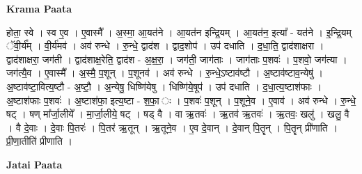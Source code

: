 \documentclass[17pt]{extarticle}
\begin{document}
\textbf{Krama Paata} \newline

होता॒ स्वे । स्व ए॒व । ए॒वास्मै᳚ । अ॒स्मा॒ आ॒यत॑ने । आ॒यत॑न इन्द्रि॒यम् । आ॒यत॑न॒ इत्या᳚ - यत॑ने । इ॒न्द्रि॒यम् ॅवी॒र्य᳚म् । वी॒र्य॑मव॑ । अव॑ रुन्धे । रु॒न्धे॒ द्वाद॑श । द्वाद॒शोप॑ । उप॑ दधाति । द॒धा॒ति॒ द्वाद॑शाक्षरा । द्वाद॑शाक्षरा॒ जग॑ती । द्वाद॑शाक्ष॒रेति॒ द्वाद॑श - अ॒क्ष॒रा॒ । जग॑ती॒ जाग॑ताः । जाग॑ताः प॒शवः॑ । प॒शवो॒ जग॑त्या । जग॑त्यै॒व । ए॒वास्मै᳚ । अ॒स्मै॒ प॒शून् । प॒शूनव॑ । अव॑ रुन्धे । रु॒न्धे॒ऽष्टाव॑ष्टौ । अ॒ष्टाव॑ष्टाव॒न्येषु॑ । अ॒ष्टाव॑ष्टा॒वित्य॒ष्टौ - अ॒ष्टौ॒ । अ॒न्येषु॒ धिष्णि॑येषु । धिष्णि॑ये॒षूप॑ । उप॑ दधाति । द॒धा॒त्य॒ष्टाश॑फाः । अ॒ष्टाश॑फाः प॒शवः॑ । अ॒ष्टाश॑फा॒ इत्य॒ष्टा - श॒फा॒ ः । प॒शवः॑ प॒शून् । प॒शूने॒व । ए॒वाव॑ । अव॑ रुन्धे । रु॒न्धे॒ षट् । षण् मा᳚र्जा॒लीये᳚ । मा॒र्जा॒लीये॒ षट् । षड् वै । वा ऋ॒तवः॑ । ऋ॒तव॑ ऋ॒तवः॑ । ऋ॒तवः॒ खलु॑ । खलु॒ वै । वै दे॒वाः । दे॒वाः पि॒तरः॑ । पि॒तर॑ ऋ॒तून् । ऋ॒तूने॒व । ए॒व दे॒वान् । दे॒वान् पि॒तॄन् । पि॒तॄन् प्री॑णाति । प्री॒णा॒तीति॑ प्रीणाति । \newline

\textbf{Jatai Paata} \newline
\end{document}

